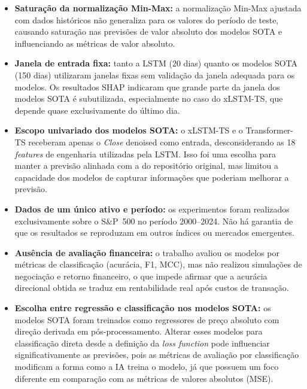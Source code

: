 \begin{itemize}
    \item \textbf{Saturação da normalização Min-Max:} a normalização Min-Max ajustada com dados históricos não generaliza para os valores do período de teste, causando saturação nas previsões de valor absoluto dos modelos SOTA e influenciando as métricas de valor absoluto.

    \item \textbf{Janela de entrada fixa:} tanto a LSTM (20 dias) quanto os modelos SOTA (150 dias) utilizaram janelas fixas sem validação da janela adequada para os modelos. Os resultados SHAP indicaram que grande parte da janela dos modelos SOTA é subutilizada, especialmente no caso do xLSTM-TS, que depende quase exclusivamente do último dia.

    \item \textbf{Escopo univariado dos modelos SOTA:} o xLSTM-TS e o Transformer-TS receberam apenas o \textit{Close} denoised como entrada, desconsiderando as 18 \textit{features} de engenharia utilizadas pela LSTM. Isso foi uma escolha para manter a previsão alinhada com a do repositório original, mas limitou a capacidade dos modelos de capturar informações que poderiam melhorar a previsão.

    \item \textbf{Dados de um único ativo e período:} os experimentos foram realizados exclusivamente sobre o S\&P~500 no período 2000--2024. Não há garantia de que os resultados se reproduzam em outros índices ou mercados emergentes.

    \item \textbf{Ausência de avaliação financeira:} o trabalho avaliou os modelos por métricas de classificação (acurácia, F1, MCC), mas não realizou simulações de negociação e retorno financeiro, o que impede afirmar que a acurácia direcional obtida se traduz em rentabilidade real após custos de transação.

    \item \textbf{Escolha entre regressão e classificação nos modelos SOTA:} os modelos SOTA foram treinados como regressores de preço absoluto com direção derivada em pós-processamento. Alterar esses modelos para classificação direta desde a definição da \textit{loss function} pode influenciar significativamente as previsões, pois as métricas de avaliação por classificação modificam a forma como a IA treina o modelo, já que possuem um foco diferente em comparação com as métricas de valores absolutos (MSE).
\end{itemize}

